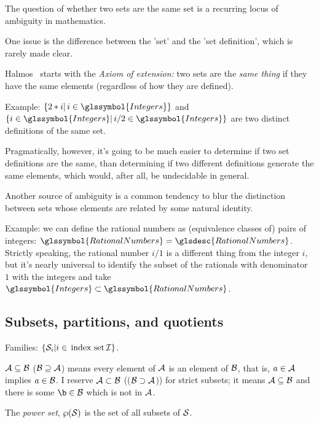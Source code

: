 The question of whether two sets are the same set is a recurring
locus of ambiguity in mathematics.

One issue is the difference between the 'set' and the 
'set definition', which is rarely made clear.

Halmos~\cite{Halmos1960Naive} starts with the \emph{Axiom of
extension:} two sets are the \emph{same thing} if they have the
same elements (regardless of how they are defined).

Example: 
$\{ 2*i | \, i \in \glssymbol{Integers} \}$
and
$\{ i \in \glssymbol{Integers} |
 \, i/2 \in \glssymbol{Integers} \}$
are two distinct definitions of the same set. 
 
Pragmatically, however, it's going to be much easier to determine
if two set definitions are the same, than determining if two
different definitions generate the same elements, which would,
after all, be undecidable in general.

Another source of ambiguity is a common tendency to blur the 
distinction between sets whose elements are related by some natural
identity. 

Example: we can define the rational numbers as (equivalence
classes of) pairs of integers:
$\glssymbol{RationalNumbers} = \glsdesc{RationalNumbers}$.
Strictly speaking, the rational number $i/1$ is a different thing
from the integer $i$, but it's nearly universal to identify the
subset of the rationals with denominator $1$ with the integers and
take $\glssymbol{Integers} \subset \glssymbol{RationalNumbers}$.

\subsection{Subsets, partitions, and quotients}

Families: $\{ \mathcal{S}_{i} | i \in \, \text{index set} \, \mathcal{I}
\}$.



$\mathcal{A} \subseteq \mathcal{B}$ ($\mathcal{B} \supseteq \mathcal{A}$)
means
every element of $\mathcal{A}$ is an element of $\mathcal{B}$, 
that is, $a \in \mathcal{A}$ 
implies $a \in \mathcal{B}$.
I reserve $\mathcal{A} \subset \mathcal{B}$ (($\mathcal{B} \supset
\mathcal{A}$)) for strict subsets;
it means $\mathcal{A} \subseteq \mathcal{B}$
and there is some $\b\in\aSet{B}$ which
is not in $\mathcal{A}$.



The \emph{power set}, ${\displaystyle \wp}(\mathcal{S})$ is the set 
of all subsets of
$\mathcal{S}$.

